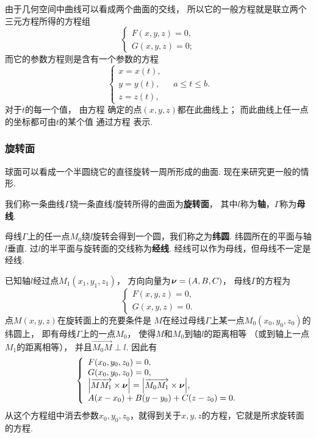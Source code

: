 由于几何空间中曲线可以看成两个曲面的交线，
所以它的一般方程就是联立两个三元方程所得的方程组\[
	\left\{ \begin{array}{l}
		F(x,y,z) = 0, \\
		G(x,y,z) = 0;
	\end{array} \right.
\]
而它的参数方程则是含有一个参数的方程
\begin{equation}\label{equation:解析几何.曲线的参数方程}
	\left\{ \begin{array}{l}
		x = x(t), \\
		y = y(t), \\
		z = z(t),
	\end{array} \right.
	\quad
	a \leqslant t \leqslant b.
\end{equation}
对于\(t\)的每一个值，
由方程  确定的点\((x,y,z)\)都在此曲线上；
而此曲线上任一点的坐标都可由\(t\)的某个值
通过方程  表示.

\subsubsection{旋转面}
球面可以看成一个半圆绕它的直径旋转一周所形成的曲面.
现在来研究更一般的情形.

我们称一条曲线\(\Gamma\)绕一条直线\(l\)旋转所得的曲面为\textbf{旋转面}，
其中\(l\)称为\textbf{轴}，\(\Gamma\)称为\textbf{母线}.

母线\(\Gamma\)上的任一点\(M_0\)绕\(l\)旋转会得到一个圆，我们称之为\textbf{纬圆}.
纬圆所在的平面与轴\(l\)垂直.
过\(l\)的半平面与旋转面的交线称为\textbf{经线}.
经线可以作为母线，但母线不一定是经线.

已知轴\(l\)经过点\(M_1(x_1,y_1,z_1)\)，
方向向量为\(\boldsymbol{\nu}=(A,B,C)\)，
母线\(\Gamma\)的方程为\[
	\left\{ \begin{array}{l}
		F(x,y,z) = 0, \\
		G(x,y,z) = 0.
	\end{array} \right.
\]
点\(M(x,y,z)\)在旋转面上的充要条件是
\(M\)在经过母线\(\Gamma\)上某一点\(M_0(x_0,y_0,z_0)\)的纬圆上，
即有母线\(\Gamma\)上的一点\(M_0\)，
使得\(M\)和\(M_0\)到轴\(l\)的距离相等
（或到轴上一点\(M_1\)的距离相等），
并且\(\vec{M_0 M} \perp l\).
因此有\[
	\left\{ \begin{array}{l}
		F(x_0,y_0,z_0) = 0, \\
		G(x_0,y_0,z_0) = 0, \\
		\abs{\overrightarrow{M M_1} \times \boldsymbol{\nu}} = \abs{\overrightarrow{M_0 M_1} \times \boldsymbol{\nu}}, \\
		A(x-x_0) + B(y-y_0) + C(z-z_0) = 0.
	\end{array} \right.
\]
从这个方程组中消去参数\(x_0,y_0,z_0\)，就得到关于\(x,y,z\)的方程，它就是所求旋转面的方程.

